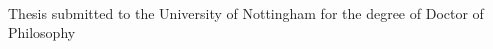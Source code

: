 \begin{titlepage}
	\begin{addmargin}[-1cm]{-3cm}
    \begin{center}
        \large  

        \hfill

        \vfill

        \begingroup
            \color{Maroon}\spacedallcaps{\myTitle} \\ \bigskip
        \endgroup

        \spacedlowsmallcaps{\myName}

        \vfill


        Thesis submitted to the University of Nottingham
 for the degree of Doctor of Philosophy \medskip   


        \myTime\ %

        \vfill                      

    \end{center}  
  \end{addmargin}       
\end{titlepage}   